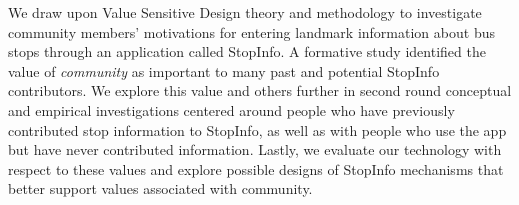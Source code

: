 

We draw upon Value Sensitive Design theory and methodology to investigate community members' motivations for entering landmark information about bus stops through an application called StopInfo. A formative study identified the value of \emph{community} as important to many past and potential StopInfo contributors. We explore this value and others further in second round conceptual and empirical investigations centered around people who have previously contributed stop information to StopInfo, as well as with people who use the app but have never contributed information. Lastly, we evaluate our technology with respect to these values and explore possible designs of StopInfo mechanisms that better support values associated with community. 